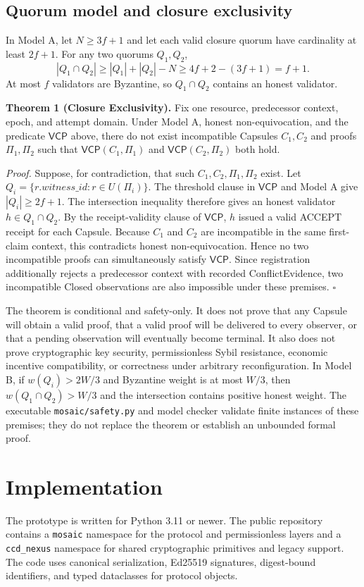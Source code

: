 \documentclass{ledger}
\begin{document}
\subsection{Quorum model and closure exclusivity}
In Model A, let $N\geq3f+1$ and let each valid closure quorum have cardinality at least $2f+1$. For any two quorums $Q_1,Q_2$,
\begin{equation}
|Q_1\cap Q_2|\geq |Q_1|+|Q_2|-N\geq4f+2-(3f+1)=f+1.
\end{equation}
At most $f$ validators are Byzantine, so $Q_1\cap Q_2$ contains an honest validator.

\textbf{Theorem 1 (Closure Exclusivity).} Fix one resource, predecessor context, epoch, and attempt domain. Under Model A, honest non-equivocation, and the predicate $\mathsf{VCP}$ above, there do not exist incompatible Capsules $C_1,C_2$ and proofs $\Pi_1,\Pi_2$ such that $\mathsf{VCP}(C_1,\Pi_1)$ and $\mathsf{VCP}(C_2,\Pi_2)$ both hold.

\emph{Proof.} Suppose, for contradiction, that such $C_1,C_2,\Pi_1,\Pi_2$ exist. Let $Q_i=\{r.\mathit{witness\_id}:r\in U(\Pi_i)\}$. The threshold clause in $\mathsf{VCP}$ and Model A give $|Q_i|\geq2f+1$. The intersection inequality therefore gives an honest validator $h\in Q_1\cap Q_2$. By the receipt-validity clause of $\mathsf{VCP}$, $h$ issued a valid ACCEPT receipt for each Capsule. Because $C_1$ and $C_2$ are incompatible in the same first-claim context, this contradicts honest non-equivocation. Hence no two incompatible proofs can simultaneously satisfy $\mathsf{VCP}$. Since registration additionally rejects a predecessor context with recorded ConflictEvidence, two incompatible Closed observations are also impossible under these premises. $\square$

The theorem is conditional and safety-only. It does not prove that any Capsule will obtain a valid proof, that a valid proof will be delivered to every observer, or that a pending observation will eventually become terminal. It also does not prove cryptographic key security, permissionless Sybil resistance, economic incentive compatibility, or correctness under arbitrary reconfiguration. In Model B, if $w(Q_i)>2W/3$ and Byzantine weight is at most $W/3$, then $w(Q_1\cap Q_2)>W/3$ and the intersection contains positive honest weight. The executable \texttt{mosaic/safety.py} and model checker validate finite instances of these premises; they do not replace the theorem or establish an unbounded formal proof.

\section{Implementation}
The prototype is written for Python 3.11 or newer. The public repository contains a \texttt{mosaic} namespace for the protocol and permissionless layers and a \texttt{ccd\_nexus} namespace for shared cryptographic primitives and legacy support. The code uses canonical serialization, Ed25519 signatures, digest-bound identifiers, and typed dataclasses for protocol objects.
\end{document}

